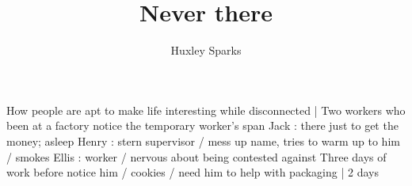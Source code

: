 \title{Never there}
\author{Huxley Sparks}
\begin{Outline}
        How people are apt to make life interesting while disconnected | Two workers who been at a factory notice the temporary worker's span
            Jack : there just to get the money; asleep
            Henry : stern supervisor / mess up name, tries to warm up to him / smokes
            Ellis : worker / nervous about being contested against
        Three days of work before notice him / cookies / need him to help with packaging | 2 days
\end{Outline}
